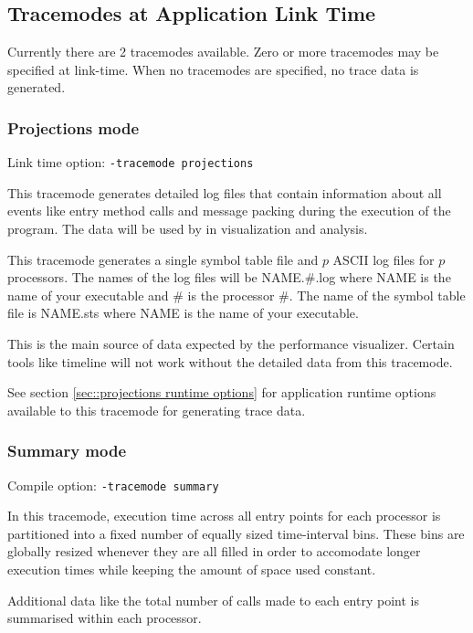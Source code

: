 \documentclass[10pt]{article}
\begin{document}
\subsection{Tracemodes at Application Link Time}
\label{sec::trace modules}

Currently there are 2 tracemodes available. Zero or more tracemodes
may be specified at link-time. When no tracemodes are specified, no
trace data is generated.

\subsubsection{Projections mode}

Link time option: {\tt -tracemode projections}

This tracemode generates detailed log files that contain information
about all \charmpp{} events like entry method calls and message
packing during the execution of the program.  The data will be used by
\projections{} in visualization and analysis.

This tracemode generates a single symbol table file and $p$ ASCII log
files for $p$ processors. The names of the log files will be
NAME.\#.log where NAME is the name of your executable and \# is the
processor \#. The name of the symbol table file is NAME.sts where NAME
is the name of your executable.

This is the main source of data expected by the performance
visualizer. Certain tools like timeline will not work without the
detailed data from this tracemode.

See section \ref{sec::projections runtime options} for application runtime
options available to this tracemode for generating trace data.

\subsubsection{Summary mode}

Compile option: {\tt -tracemode summary}

In this tracemode, execution time across all entry points for each
processor is partitioned into a fixed number of equally sized
time-interval bins. These bins are globally resized whenever they are
all filled in order to accomodate longer execution times while keeping
the amount of space used constant.

Additional data like the total number of calls made to each entry
point is summarised within each processor.
\end{document}

